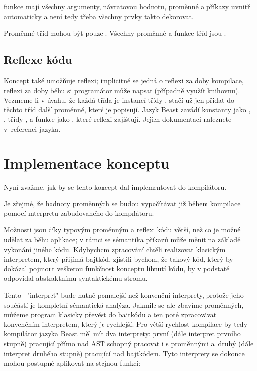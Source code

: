 \ctime funkce mají všechny argumenty, návratovou hodnotu, proměnné a příkazy uvnitř automaticky \ctime a není tedy třeba všechny prvky takto dekorovat.

Proměnné \ctime tříd mohou být pouze \ctime. Všechny proměnné a funkce \ctime tříd jsou \ctime.

\subsection{Reflexe kódu} \label{ctime:reflection}
Koncept také umožňuje reflexi; implicitně se jedná o reflexi za doby kompilace, reflexi za doby běhu si programátor může napsat (případně využít knihovnu). Vezmeme-li v úvahu, že každá třída je instancí \ctime třídy , stačí už jen přidat do těchto tříd další \ctime proměnné, které je popisují. Jazyk Beast zavádí \ctime konstanty jako , , třídy ,  a funkce jako , které reflexi zajišťují. Jejich dokumentaci naleznete v~referenci jazyka.

\section{Implementace konceptu}
Nyní zvažme, jak by se tento koncept dal implementovat do kompilátoru.

Je zřejmé, že hodnoty \ctime proměnných se budou vypočítávat již během kompilace pomocí interpretu zabudovaného do kompilátoru.

Možnosti \ctime jsou díky \hyperref[ctime:typeVars]{typovým proměnným} a \hyperref[ctime:reflection]{reflexi kódu} větší, než co je možné udělat za běhu aplikace; v rámci \ctime se sémantika příkazů může měnit na základě vykonání jiného \ctime kódu. Kdybychom zpracování \ctime chtěli realizovat klasickým interpretem, který přijímá bajtkód, zjistili bychom, že takový kód, který by dokázal pojmout veškerou funkčnost konceptu líhnutí kódu, by v podstatě odpovídal abstraktnímu syntaktickému stromu.

Tento \ctime~"interpret" bude nutně pomalejší než konvenční interprety, protože jeho součástí je kompletní sémantická analýza. Jakmile se ale zbavíme \ctime proměnných, můžeme program klasicky převést do bajtkódu a ten poté zpracovávat konvenčním interpretem, který je rychlejší. Pro větší rychlost kompilace by tedy kompilátor jazyka Beast měl mít dva interprety: první (dále interpret prvního stupně) pracující přímo nad AST schopný pracovat i s \ctime proměnnými a~druhý (dále interpret druhého stupně) pracující nad bajtkódem. Tyto interprety se dokonce mohou postupně aplikovat na stejnou funkci:

